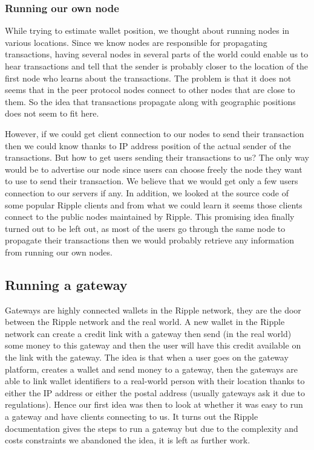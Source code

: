 \subsubsection{Running our own node}
While trying to estimate wallet position, we thought about running nodes in various locations. Since we know nodes are responsible for propagating transactions, having several nodes in several parts of the world could enable us to hear transactions and tell that the sender is probably closer to the location of the first node who learns about the transactions. The problem is that it does not seems that in the peer protocol nodes connect to other nodes that are close to them. So the idea that transactions propagate along with geographic positions does not seem to fit here.

However, if we could get client connection to our nodes to send their transaction then we could know thanks to IP address position of the actual sender of the transactions. But how to get users sending their transactions to us? The only way would be to advertise our node since users can choose freely the node they want to use to send their transaction. We believe that we would get only a few users connection to our servers if any. In addition, we looked at the source code of some popular Ripple clients and from what we could learn it seems those clients connect to the public nodes maintained by Ripple. This promising idea finally turned out to be left out, as most of the users go through the same node to propagate their transactions then we would probably retrieve any information from running our own nodes.

\subsection{Running a gateway}
Gateways are highly connected wallets in the Ripple network, they are the door between the Ripple network and the real world. A new wallet in the Ripple network can create a credit link with a gateway then send (in the real world) some money to this gateway and then the user will have this credit available on the link with the gateway. The idea is that when a user goes on the gateway platform, creates a wallet and send money to a gateway, then the gateways are able to link wallet identifiers to a real-world person with their location thanks to either the IP address or either the postal address (usually gateways ask it due to regulations). Hence our first idea was then to look at whether it was easy to run a gateway and have clients connecting to us. It turns out the Ripple documentation\cite{runGateway} gives the steps to run a gateway but due to the complexity and costs constraints we abandoned the idea, it is left as further work.

